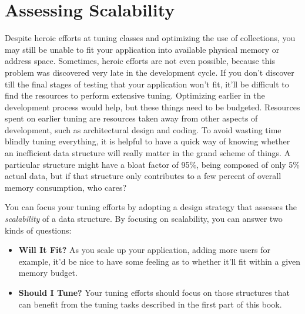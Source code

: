 \chapter{Assessing Scalability}

Despite heroic efforts at tuning classes and optimizing the use of collections,
you may still be unable to fit your application into available physical memory
or address space. Sometimes, heroic efforts are not even possible, because this
problem was discovered very late in the development cycle. If you don't discover
till the final stages of testing that your application won't fit, it'll be
difficult to find the resources to perform extensive tuning. Optimizing earlier
in the development process would help, but these things need to be budgeted.
Resources spent on earlier tuning are resources taken away from other aspects of
development, such as architectural design and coding. To avoid wasting time
blindly tuning everything, it is helpful to have a quick way of knowing whether
an inefficient data structure will really matter in the grand scheme of things.
A particular structure might have a bloat factor of 95\%, being composed of only
5\% actual data, but if that structure only contributes to a few percent of
overall memory consumption, who cares?

You can focus your tuning efforts by adopting a design strategy that assesses
the \emph{scalability} of a data structure. By focusing on scalability, you can
answer two kinds of questions:
\begin{itemize}
  \item \textbf{Will It Fit?} As you scale up your application, adding more
  users for example, it'd be nice to have some feeling as to whether it'll fit
  within a given memory budget.
  \item \textbf{Should I Tune?} Your tuning efforts should focus 
on those structures that can benefit from the tuning tasks described in
the first part of this book.
\end{itemize}


